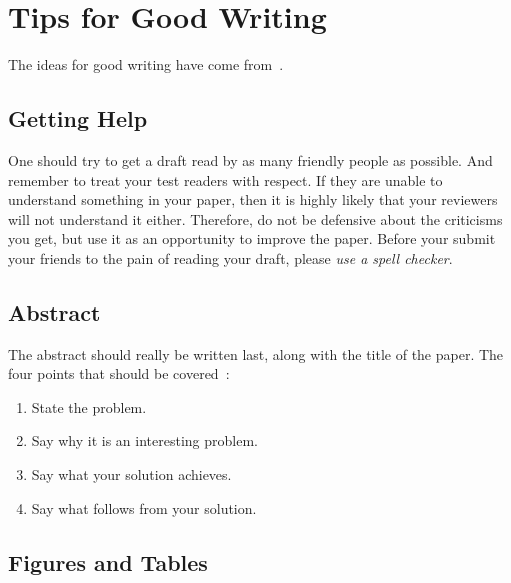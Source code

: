 \section{Tips for Good Writing}
\label{sec:tips-writing}

The ideas for good writing have come
from~\cite{editor10,jones08,anderson04}.

\subsection{Getting Help}
One should try to get a draft read by as many friendly people as
possible. And remember to treat your test readers with respect. If
they are unable to understand something in your paper, then it is
highly likely that your reviewers will not understand it
either. Therefore, do not be defensive about the criticisms you get,
but use it as an opportunity to improve the paper. Before your submit
your friends to the pain of reading your draft, please \emph{use a
  spell checker}.

\subsection{Abstract}
The abstract should really be written last, along with the title of
the paper. The four points that should be covered~\cite{jones08}:
\begin{enumerate}
\item State the problem.
\item Say why it is an interesting problem.
\item Say what your solution achieves.
\item Say what follows from your solution.
\end{enumerate}

\subsection{Figures and Tables}

